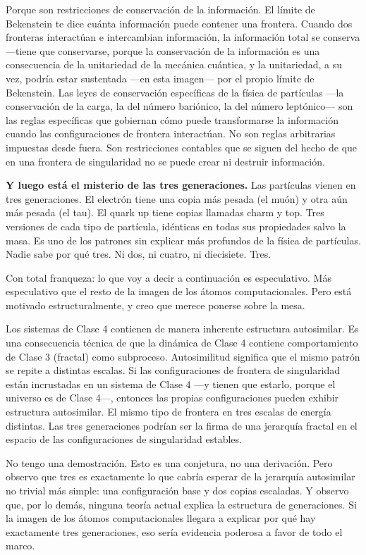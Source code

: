 \documentclass[11pt, twoside, openright]{book}
\begin{document}
Porque son restricciones de conservación de la información. El límite de Bekenstein te dice cuánta información puede contener una frontera. Cuando dos fronteras interactúan e intercambian información, la información total se conserva ---tiene que conservarse, porque la conservación de la información es una consecuencia de la unitariedad de la mecánica cuántica, y la unitariedad, a su vez, podría estar sustentada ---en esta imagen--- por el propio límite de Bekenstein. Las leyes de conservación específicas de la física de partículas ---la conservación de la carga, la del número bariónico, la del número leptónico--- son las reglas específicas que gobiernan cómo puede transformarse la información cuando las configuraciones de frontera interactúan. No son reglas arbitrarias impuestas desde fuera. Son restricciones contables que se siguen del hecho de que en una frontera de singularidad no se puede crear ni destruir información.

\textbf{Y luego está el misterio de las tres generaciones.} Las partículas vienen en tres generaciones. El electrón tiene una copia más pesada (el muón) y otra aún más pesada (el tau). El quark up tiene copias llamadas charm y top. Tres versiones de cada tipo de partícula, idénticas en todas sus propiedades salvo la masa. Es uno de los patrones sin explicar más profundos de la física de partículas. Nadie sabe por qué tres. Ni dos, ni cuatro, ni diecisiete. Tres.

Con total franqueza: lo que voy a decir a continuación es especulativo. Más especulativo que el resto de la imagen de los átomos computacionales. Pero está motivado estructuralmente, y creo que merece ponerse sobre la mesa.

Los sistemas de Clase 4 contienen de manera inherente estructura autosimilar. Es una consecuencia técnica de que la dinámica de Clase 4 contiene comportamiento de Clase 3 (fractal) como subproceso. Autosimilitud significa que el mismo patrón se repite a distintas escalas. Si las configuraciones de frontera de singularidad están incrustadas en un sistema de Clase 4 ---y tienen que estarlo, porque el universo es de Clase 4---, entonces las propias configuraciones pueden exhibir estructura autosimilar. El mismo tipo de frontera en tres escalas de energía distintas. Las tres generaciones podrían ser la firma de una jerarquía fractal en el espacio de las configuraciones de singularidad estables.

No tengo una demostración. Esto es una conjetura, no una derivación. Pero observo que tres es exactamente lo que cabría esperar de la jerarquía autosimilar no trivial más simple: una configuración base y dos copias escaladas. Y observo que, por lo demás, ninguna teoría actual explica la estructura de generaciones. Si la imagen de los átomos computacionales llegara a explicar por qué hay exactamente tres generaciones, eso sería evidencia poderosa a favor de todo el marco.
\end{document}

